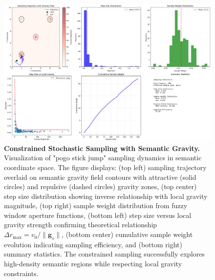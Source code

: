 \begin{figure}[htbp]
\centering
\includegraphics[width=\textwidth]{helicopter/demos/constrained_sampling_demo.png}
\caption{\textbf{Constrained Stochastic Sampling with Semantic Gravity.} Visualization of "pogo stick jump" sampling dynamics in semantic coordinate space. The figure displays: (top left) sampling trajectory overlaid on semantic gravity field contours with attractive (solid circles) and repulsive (dashed circles) gravity zones, (top center) step size distribution showing inverse relationship with local gravity magnitude, (top right) sample weight distribution from fuzzy window aperture functions, (bottom left) step size versus local gravity strength confirming theoretical relationship $\Delta r_{\max} = v_0/\|\mathbf{g}_s\|$, (bottom center) cumulative sample weight evolution indicating sampling efficiency, and (bottom right) summary statistics. The constrained sampling successfully explores high-density semantic regions while respecting local gravity constraints.}
\label{fig:constrained-sampling}
\end{figure}
